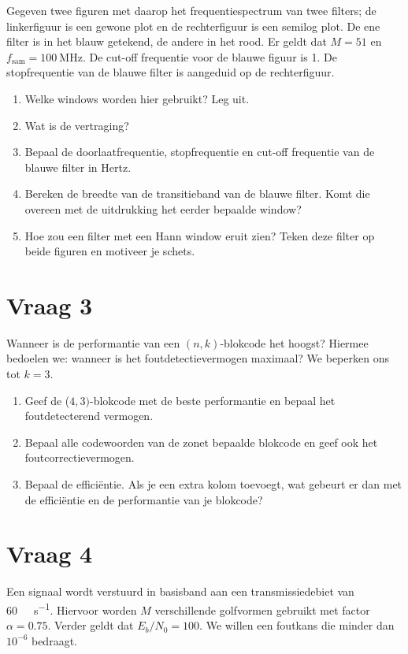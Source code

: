\documentclass[kulak]{kulakarticle}
\begin{document}
	Gegeven twee figuren met daarop het frequentiespectrum van twee filters; de linkerfiguur is een gewone plot en de rechterfiguur is een semilog plot. De ene filter is in het blauw getekend, de andere in het rood. Er geldt dat \(M=51\) en \(f_\text{sam}=\SI{100}{\mega\hertz}\). De cut-off frequentie voor de blauwe figuur is 1. De stopfrequentie van de blauwe filter is aangeduid op de rechterfiguur.

	\begin{enumerate}
		\item Welke windows worden hier gebruikt? Leg uit.
		\item Wat is de vertraging?
		\item Bepaal de doorlaatfrequentie, stopfrequentie en cut-off frequentie van de blauwe filter in Hertz.
		\item Bereken de breedte van de transitieband van de blauwe filter. Komt die overeen met de uitdrukking het eerder bepaalde window?
		\item Hoe zou een filter met een Hann window eruit zien? Teken deze filter op beide figuren en motiveer je schets.
	\end{enumerate}

	\section*{Vraag 3}

	Wanneer is de performantie van een \((n,k)\)-blokcode het hoogst? Hiermee bedoelen we: wanneer is het foutdetectievermogen maximaal? We beperken ons tot \(k=3\).

	\begin{enumerate}
		\item Geef de (\(4,3)\)-blokcode met de beste performantie en bepaal het foutdetecterend vermogen.
		\item Bepaal alle codewoorden van de zonet bepaalde blokcode en geef ook het foutcorrectievermogen.
		\item Bepaal de efficiëntie. Als je een extra kolom toevoegt, wat gebeurt er dan met de efficiëntie en de performantie van je blokcode?
	\end{enumerate}

	\section*{Vraag 4}

	Een signaal wordt verstuurd in basisband aan een transmissiedebiet van \SI{60}{\kilo\bit\per\second}. Hiervoor worden \(M\) verschillende golfvormen gebruikt met factor \(\alpha = 0.75\). Verder geldt dat \(E_b/N_0=100\). We willen een foutkans die minder dan \(10^{-6}\) bedraagt.
\end{document}
